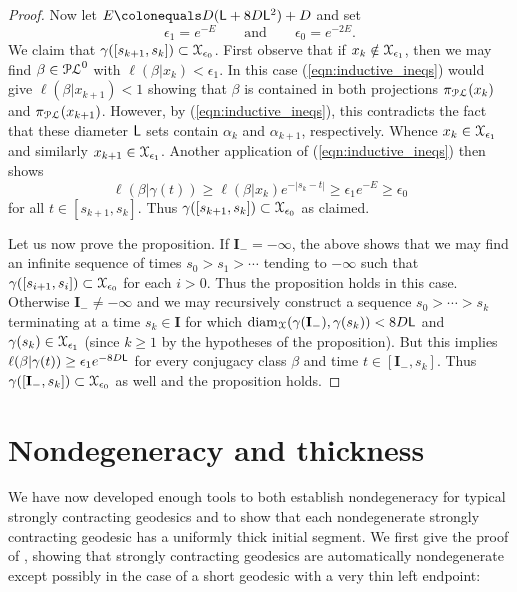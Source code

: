 \documentclass[letterpaper,fleqn]{article}
\theoremstyle{plain}
\theoremstyle{definition}
\DeclareMathOperator{\diam}{diam}
\newcommand{\abs}[1]{\left\vert#1\right\vert}
\newcommand{\pl}{{\EuScript{PL}}} %
\newcommand{\os}{{\EuScript X}} %
\newcommand{\plproj}{\pi_\pl} %
\newcommand{\len}{\ell}  %
\newcommand{\lipconst}{{\sf L}} %
\renewcommand{\diam}{\mathrm{diam}}
\newcommand{\I}{\mathbf{I}}
\newcommand{\Imin}{\I_-}
\begin{document}
\begin{proof}
Now let $E \colonequals D(\lipconst+8D\lipconst^2)+D$ and set
\[\epsilon_1 = e^{-E}\qquad\text{and}\qquad\epsilon_0 = e^{-2E}.\]
We claim that $\gamma([s_{k+1},s_k])\subset \os_{\epsilon_0}$. First observe that if $x_k\notin \os_{\epsilon_1}$, then we may find $\beta\in\pl^0$ with $\len(\beta\vert x_k) <\epsilon_1$. In this case (\ref{eqn:inductive_ineqs}) would give $\len(\beta\vert x_{k+1})< 1$ showing that $\beta$ is contained in both projections $\plproj(x_k)$ and $\plproj(x_{k+1})$. However, by (\ref{eqn:inductive_ineqs}), this contradicts the fact that these diameter $\lipconst$ sets contain $\alpha_k$ and $\alpha_{k+1}$, respectively. Whence $x_k\in \os_{\epsilon_1}$ and similarly $x_{k+1}\in\os_{\epsilon_1}$. Another application of (\ref{eqn:inductive_ineqs}) then shows 
\[\len(\beta \vert\gamma(t)) \ge \len(\beta\vert x_k) e^{-\abs{s_k-t}} \ge \epsilon_1 e^{-E} \ge \epsilon_0\]
for all $t\in [s_{k+1},s_k]$. Thus $\gamma([s_{k+1},s_k])\subset \os_{\epsilon_0}$ as claimed.

Let us now prove the proposition. If $\Imin = -\infty$, the above shows that we may find an infinite sequence of times $s_0 > s_1 > \dotsb$ tending to $-\infty$ such that $\gamma([s_{i+1},s_i])\subset \os_{\epsilon_0}$ for each $i>0$. Thus the proposition holds in this case. Otherwise $\Imin \ne -\infty$ and we may recursively construct a sequence $s_0 > \dotsb > s_k$ terminating at a time $s_k\in \I$ for which $\diam_\os(\gamma(\Imin),\gamma(s_k)) <8D\lipconst$ and $\gamma(s_k)\in\os_{\epsilon_1}$ (since $k\ge 1$ by the hypotheses of the proposition). But this implies $\len(\beta\vert\gamma(t))\ge \epsilon_1 e^{-8D\lipconst}$ for every conjugacy class $\beta$ and time $t\in [\Imin,s_k]$. Thus $\gamma([\Imin,s_k])\subset\os_{\epsilon_0}$ as well and the proposition holds.
\end{proof}
 
\section{Nondegeneracy and thickness}
\label{sec:nondegeneracy}

We have now developed enough tools to both establish nondegeneracy for typical strongly contracting geodesics and to show that each nondegenerate strongly contracting geodesic has a uniformly thick initial segment. We first give the proof of , showing that strongly contracting geodesics are automatically nondegenerate except possibly in the case of a short geodesic with a very thin left endpoint:
\end{document}
